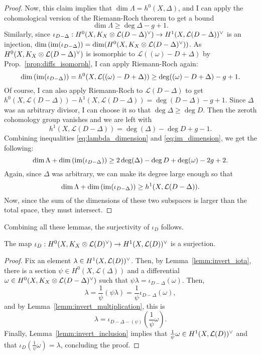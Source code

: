 \begin{proof}
  Now, this claim implies that $\dim\Lambda=h^{0}(X,\Delta)$, and I can apply
  the cohomological version of the Riemann-Roch theorem to get a bound
  \begin{equation}\label{eq:lambda_dimension}
    \dim\Lambda\geq \deg{\Delta}-g+1.
  \end{equation}
  Similarly, since $\iota_{D-\Delta}:H^0(X,K_X\otimes\mathcal{L}(D-\Delta)^{\vee})\to H^1(X,\mathcal{L}(D-\Delta))^{\vee}$
  is an injection, $\dim\left(\operatorname{im}(\iota_{D-\Delta})\right)
  =\dim(H^0(X,K_X\otimes\mathcal{L}(D-\Delta)^{\vee}))$. As $H^0(X,K_X\otimes\mathcal{L}(D-\Delta)^{\vee})$ is isomorphic to
  $\mathcal{L}((\omega)-D+\Delta)$ by Prop.~\ref{prop:diffs_isomorph},
  I can apply Riemann-Roch again:
  \begin{equation}\label{eq:im_dimension}
    \dim\left(\operatorname{im}(\iota_{D-\Delta})\right)
    =h^{0}(X,\mathcal{L}((\omega)-D+\Delta))\geq \deg((\omega)-D+\Delta)-g+1.
  \end{equation}
  Of course, I can also apply Riemann-Roch to $\mathcal{L}(D-\Delta)$
  to get $h^{0}(X,\mathcal{L}(D-\Delta))-h^{1}(X,\mathcal{L}(D-\Delta))
  =\deg(D-\Delta)-g+1$. Since $\Delta$ was an arbitrary divisor, I can
  choose it so that $\deg\Delta\geq\deg D$. Then the zeroth cohomology
  group vanishes and we are left with
  \begin{equation}\label{eq:fst_dimension}
    h^{1}(X,\mathcal{L}(D-\Delta))=\deg(\Delta)-\deg D+g-1.
  \end{equation}
  Combining inequalities \eqref{eq:lambda_dimension} and
  \eqref{eq:im_dimension}, we get the following:
  \[
    \dim\Lambda+\dim\left(\operatorname{im}(\iota_{D-\Delta})\right)
    \geq 2\deg(\Delta)-\deg D+\deg(\omega)-2g+2.
  \]
  Again, since $\Delta$ was arbitrary, we can make its degree large enough
  so that
  \[
    \dim\Lambda+\dim\left(\operatorname{im}(\iota_{D-\Delta})\right)
    \geq h^{1}(X,\mathcal{L}(D-\Delta)).
  \]
  Now, since the sum of the dimensions of these two subspaces is larger
  than the total space, they must intersect.
\end{proof}
Combining all these lemmas, the surjectivity of $\iota_{D}$ follows.
\begin{prop}\label{prop:surjectivity}
  The map $\iota_{D}:H^0(X,K_X\otimes\mathcal{L}(D)^{\vee})\to H^1(X,\mathcal{L}(D))^{\vee}$ is a surjection.
\end{prop}
\begin{proof}
  Fix an element $\lambda\in H^1(X,\mathcal{L}(D))^{\vee}$. Then, by Lemma~\ref{lemm:invert_iota},
  there is a section $\psi\in H^{0}(X,\mathcal{L}(\Delta))$ and a differential
  $\omega\in H^0(X,K_X\otimes\mathcal{L}(D-\Delta)^{\vee})$ such that $\psi\lambda=\iota_{D-\Delta}(\omega)$.
  Then,
  \[\lambda=\frac1{\psi}(\psi\lambda)=\frac1{\psi}\iota_{D-\Delta}(\omega),\]
  and by Lemma~\ref{lemm:invert_multiplication}, this is
  \[\lambda=\iota_{D-\Delta-(\psi)}(\frac1{\psi}\omega).\]
  Finally, Lemma~\ref{lemm:invert_inclusion} implies that
  $\frac1{\psi}\omega\in H^1(X,\mathcal{L}(D))^{\vee}$ and that $\iota_{D}(\frac1{\psi}\omega)
  =\lambda$, concluding the proof.
\end{proof}
